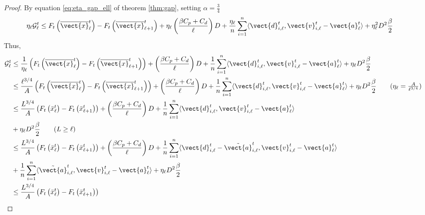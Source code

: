 \begin{proof}
By equation \ref{eq:eta_gap_ell} of theorem \ref{thm:gap}, setting $\alpha = \frac{3}{4}$
\begin{align}
         \eta_{\ell} \mathcal{G}^t_{\ell} 
        & \leq F_t \left( \overline{\vect{x}}^t_{\ell} \right) - F_t \left( \overline{\vect{x}}^t_{\ell+1} \right) 
        + \eta_{\ell}\left( \frac{\beta C_p + C_d}{\ell}\right)D + \frac{\eta_{\ell}}{n} \sum_{i=1}^{n}\langle \vect{d}^t_{i,\ell}, \vect{v}^t_{i,\ell} - \vect{a}^t_{\ell} \rangle + \eta^2_{\ell}D^2 \frac{\beta}{2}
\end{align}
Thus, 
\begin{align*}
        \mathcal{G}^t_{\ell} 
        & \leq 
         \frac{1}{\eta_{\ell}}\left(F_t \left( \overline{\vect{x}}^t_{\ell} \right) - F_t \left( \overline{\vect{x}}^t_{\ell+1} \right) \right) 
        + \left( \frac{\beta C_p + C_d}{\ell}\right)D + \frac{1}{n} \sum_{i=1}^{n}\langle \vect{d}^t_{i,\ell}, \vect{v}^t_{i,\ell} - \vect{a}^{t}_{\ell} \rangle + \eta_{\ell}D^2 \frac{\beta}{2} \\
        & \leq \frac{\ell^{3/4}}{A}\left(F_t \left( \overline{\vect{x}}^t_{\ell} \right) - F_t \left( \overline{\vect{x}}^t_{\ell+1} \right) \right) 
        + \left( \frac{\beta C_p + C_d}{\ell}\right)D + \frac{1}{n} \sum_{i=1}^{n}\langle \vect{d}^t_{i,\ell}, \vect{v}^t_{i,\ell} - \vect{a}^{t}_{\ell} \rangle + \eta_{\ell}D^2 \frac{\beta}{2} \tag{$\eta_{\ell} = \frac{A}{\ell^{3/4}}$}\\
       &\leq \frac{L^{3/4}}{A}\left(F_t \left( \Bar{x}^t_{\ell} \right) - F_t \left( \Bar{x}^t_{\ell+1} \right) \right) 
         + \left( \frac{\beta C_p + C_d}{\ell}\right)D 
         +\frac{1}{n} \sum_{i=1}^{n}\langle \vect{d}^t_{i,\ell}, \vect{v}^t_{i,\ell} - \vect{a}^{t}_{\ell} \rangle \\
         & + \eta_{\ell}D^2 \frac{\beta}{2} \tag{$L \geq \ell$} \\
        & \leq \frac{L^{3/4}}{A}\left(F_t \left( \Bar{x}^t_{\ell} \right) - F_t \left( \Bar{x}^t_{\ell+1} \right) \right) 
         + \left( \frac{\beta C_p + C_d}{\ell}\right)D 
         +\frac{1}{n} \sum_{i=1}^{n}\langle \vect{d}^t_{i,\ell} - \Tilde{\vect{a}}^{t}_{i, \ell}, \vect{v}^t_{i,\ell} - \vect{a}^{t}_{\ell} \rangle \\
         & + \frac{1}{n}\sum_{i=1}^{n}\langle \Tilde{\vect{a}}^{t}_{i, \ell}, \vect{v}^t_{i,\ell} - \vect{a}^{t}_{\ell} \rangle + \eta_{\ell}D^2 \frac{\beta}{2}\\
         & \leq \frac{L^{3/4}}{A}\left(F_t \left( \Bar{x}^t_{\ell} \right) - F_t \left( \Bar{x}^t_{\ell+1} \right) \right) 

\end{align*}
\end{proof}
